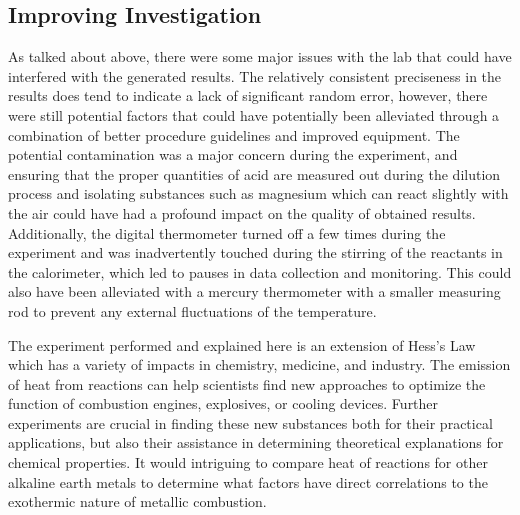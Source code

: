 \documentclass[12pt]{article}
\begin{document}
\subsection{Improving Investigation}
As talked about above, there were some major issues with the lab that could have interfered with the generated results. The relatively consistent preciseness in the results does tend to indicate a lack of significant random error, however, there were still potential factors that could have potentially been alleviated through a combination of better procedure guidelines and improved equipment. The potential contamination was a major concern during the experiment, and ensuring that the proper quantities of acid are measured out during the dilution process and isolating substances such as magnesium which can react slightly with the air could have had a profound impact on the quality of obtained results. Additionally, the digital thermometer turned off a few times during the experiment and was inadvertently touched during the stirring of the reactants in the calorimeter, which led to pauses in data collection and monitoring. This could also have been alleviated with a mercury thermometer with a smaller measuring rod to prevent any external fluctuations of the temperature.

The experiment performed and explained here is an extension of Hess's Law which has a variety of impacts in chemistry, medicine, and industry. The emission of heat from reactions can help scientists find new approaches to optimize the function of combustion engines, explosives, or cooling devices. Further experiments are crucial in finding these new substances both for their practical applications, but also their assistance in determining theoretical explanations for chemical properties. It would intriguing to compare heat of reactions for other alkaline earth metals to determine what factors have direct correlations to the exothermic nature of metallic combustion.
\printbibliography
\end{document}
